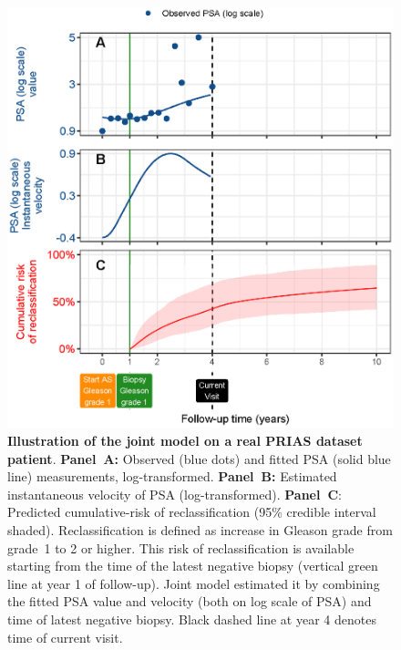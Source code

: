 \begin{figure}
\centerline{\includegraphics[width=\columnwidth]{images/jmExplanationPlot_113.eps}}
\caption{\textbf{Illustration of the joint model on a real PRIAS dataset patient}. \textbf{Panel~A:} Observed (blue dots) and fitted PSA (solid blue line) measurements, log-transformed. \textbf{Panel~B:} Estimated instantaneous velocity of PSA (log-transformed). \textbf{Panel~C}: Predicted cumulative-risk of reclassification (95\% credible interval shaded). Reclassification is defined as increase in Gleason grade \citep{epsteinGG2014} from grade~1 to 2 or higher. This risk of reclassification is available starting from the time of the latest negative biopsy (vertical green line at year 1 of follow-up). Joint model estimated it by combining the fitted PSA value and velocity (both on log scale of PSA) and time of latest negative biopsy. Black dashed line at year 4 denotes time of current visit.}
\label{fig:jmExplanationPlot_113}
\end{figure}

